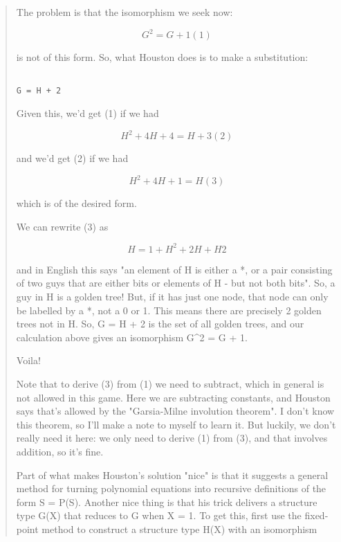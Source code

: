 \begin{quote}
The problem is that the isomorphism we seek now:


$$

G^{2} = G + 1                               (1)
$$
    
is not of this form.  So, what Houston does is to make a substitution:


\begin{verbatim}

G = H + 2
\end{verbatim}
    
Given this, we'd get (1) if we had


$$

H^{2} + 4H + 4 = H + 3                      (2)
$$
    
and we'd get (2) if we had


$$

H^{2} + 4H + 1 = H                          (3)
$$
    
which is of the desired form.  

We can rewrite (3) as


$$

H = 1 + H^{2} + 2H + H2
$$
    
and in English this says "an element of H is either a *, or
a pair consisting of two guys that are either bits or elements 
of H - but not both bits".  So, a guy in H is a golden tree! 
But, if it has just one node, that node can only be labelled
by a *, not a 0 or 1.  This means there are precisely 2 golden trees
not in H.  So, G = H + 2 is the set of all golden trees, and our
calculation above gives an isomorphism G^{2} = G + 1.

Voila!
             
Note that to derive (3) from (1) we need to subtract, which in general 
is not allowed in this game.  Here we are subtracting constants, and 
Houston says that's allowed by the "Garsia-Milne involution theorem".  
I don't know this theorem, so I'll make a note to myself to learn it.
But luckily, we don't really need it here: we only need to derive (1)
from (3), and that involves addition, so it's fine.

Part of what makes Houston's solution "nice" is that it suggests a 
general method for turning polynomial equations into recursive definitions
of the form S = P(S).  Another nice thing is that his trick delivers 
a structure type G(X) that reduces to G when X = 1.  To get this, first 
use the fixed-point method to construct a structure type H(X) with an
isomorphism



\end{quote}
